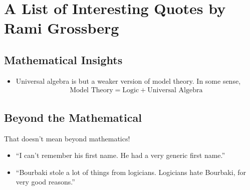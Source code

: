 \appendix

\section{A List of Interesting Quotes by Rami Grossberg}

\subsection{Mathematical Insights}

\begin{itemize}
    \item Universal algebra is but a weaker version of model theory. In some sense,
    \begin{align*}
        \text{Model Theory} = \text{Logic} + \text{Universal Algebra}
    \end{align*}

\end{itemize}

\subsection{Beyond the Mathematical}

That doesn't mean beyond mathematics!

\begin{itemize}
    \item ``I can't remember his first name. He had a very generic first name.''
    \item ``Bourbaki stole a lot of things from logicians. Logicians hate Bourbaki, for very good reasons.''
\end{itemize}